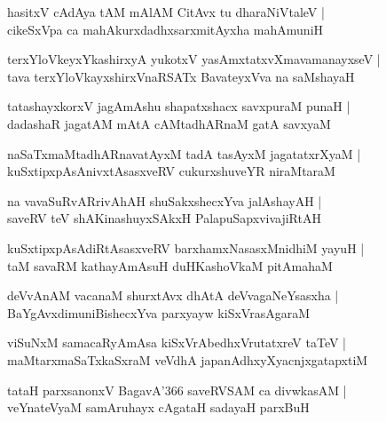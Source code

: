 \begin{shloka}
hasitxV cAdAya tAM mAlAM CitAvx tu dharaNiVtaleV |\\
cikeSxVpa ca mahAkurxdadhxsarxmitAyxha mahAmuniH
\end{shloka}

\begin{shloka}
terxYloVkeyxYkashirxyA yukotxV yasAmxtatxvXmavamanayxseV |\\
tava terxYloVkayxshirxVnaRSATx BavateyxVva na saMshayaH 
\end{shloka}

\begin{shloka}
tatashayxkorxV jagAmAshu shapatxshacx savxpuraM punaH |\\
dadashaR jagatAM mAtA cAMtadhARnaM gatA savxyaM 
\end{shloka}

\begin{shloka}
naSaTxmaMtadhARnavatAyxM tadA tasAyxM jagatatxrXyaM |\\
kuSxtipxpAsAnivxtAsasxveRV cukurxshuveYR niraMtaraM
\end{shloka}

\begin{shloka}
na vavaSuRvARrivAhAH shuSakxshecxYva jalAshayAH |\\
saveRV teV shAKinashuyxSAkxH PalapuSapxvivajiRtAH
\end{shloka}

\begin{shloka}
kuSxtipxpAsAdiRtAsasxveRV barxhamxNasasxMnidhiM yayuH |\\
taM savaRM kathayAmAsuH duHKashoVkaM pitAmahaM
\end{shloka}

\begin{shloka}
deVvAnAM vacanaM shurxtAvx dhAtA deVvagaNeYsasxha |\\
BaYgAvxdimuniBishecxYva parxyayw kiSxVrasAgaraM
\end{shloka}

\begin{shloka}
viSuNxM samacaRyAmAsa kiSxVrAbedhxVrutatxreV taTeV |\\
maMtarxmaSaTxkaSxraM veVdhA japanAdhxyXyacnjxgatapxtiM
\end{shloka}

\begin{shloka}
tataH parxsanonxV BagavA\char'366 saveRVSAM ca divwkasAM |\\
veYnateVyaM samAruhayx cAgataH sadayaH parxBuH
\end{shloka}

